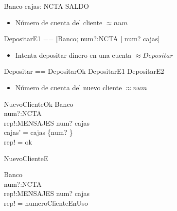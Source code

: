 \begin{schema}{Banco}
cajas: NCTA \pfun SALDO
\end{schema}

\begin{itemize}
  \item Número de cuenta del cliente $\approx num$ 
\end{itemize}


\begin{zed}
DepositarE1 == [\Xi Banco; num?:NCTA | num? \notin \dom cajas]
\end{zed}


\begin{itemize}
  \item Intenta depositar dinero en una cuenta $\approx Depositar$ 
\end{itemize}

\begin{zed}
Depositar == DepositarOk \lor DepositarE1 \lor DepositarE2
\end{zed}

\begin{itemize}
  \item Número de cuenta del nuevo cliente $\approx num$ 
\end{itemize}

\begin{schema}{NuevoClienteOk}
\Delta Banco \\
num?:NCTA \\
rep!:MENSAJES
\where
num? \notin \dom cajas \\
cajas' = cajas \cup \{num? \} \\
rep! = ok
\end{schema}

\begin{schema}{NuevoClienteE}

\Xi Banco \\
num?:NCTA \\
rep!:MENSAJES
\where
num? \in \dom cajas \\
rep! = numeroClienteEnUso
\end{schema}

